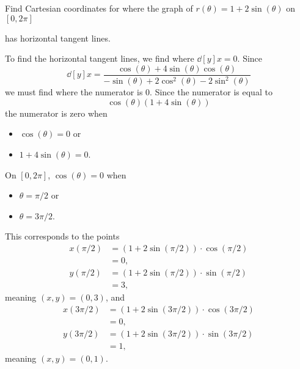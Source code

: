 \documentclass{ximera}
\begin{document}
\begin{example}
Find Cartesian coordinates for where the graph of $r(\theta)
=1+2\sin(\theta)$ on $[0,2\pi]$
  \begin{image}
  \end{image}
has horizontal tangent lines.
\begin{explanation}
  To find the horizontal tangent lines, we find where $\dd[y]{x}=0$.
  Since
  \[
  \dd[y]{x} =\frac{\cos(\theta) + 4\sin(\theta)\cos(\theta)}{-\sin(\theta) + 2\cos^2(\theta)-2\sin^2(\theta)}
  \]
  we must find where the numerator is $0$. Since the numerator is equal to
  \[
  \cos(\theta)(1+ 4\sin(\theta))
  \]
  the numerator is zero when 
  \begin{itemize}
  \item $\cos(\theta)=0$ or
  \item $1+4\sin(\theta)=0$.
  \end{itemize}
  On $[0,2\pi]$, $\cos(\theta)=0$ when
  \begin{itemize}
  \item $\theta=\pi/2$ or
  \item $\theta= 3\pi/2$.
  \end{itemize}
  This corresponds to the points
  \begin{align*}
    x(\pi/2) &= \left(1+2\sin(\pi/2)\right)\cdot\cos(\pi/2)\\
    &= 0,\\
    y(\pi/2) &= \left(1+2\sin(\pi/2)\right)\cdot\sin(\pi/2)\\
    &= 3,
  \end{align*}
  meaning $(x,y) = (0,3)$, and
  \begin{align*}
    x(3\pi/2) &= \left(1+2\sin(3\pi/2)\right)\cdot\cos(3\pi/2)\\
    &= 0,\\
    y(3\pi/2) &= \left(1+2\sin(3\pi/2)\right)\cdot\sin(3\pi/2)\\
    &= 1,
  \end{align*}
  meaning $(x,y) = (0,1)$.
  

\end{explanation}
\end{example}
\end{document}

